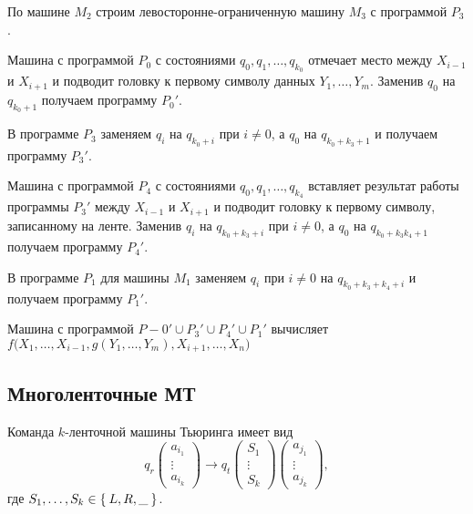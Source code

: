 \begin{eproof}
	\item По машине $ M_2 $ строим левосторонне-ограниченную машину $ M_3 $ с программой $ P_3 $.

	\item Машина с программой $ P_0 $ с состояниями $ q_0, q_1, \dots, q_{k_0} $ отмечает место между $ X_{i - 1} $ и $ X_{i + 1} $ и подводит головку к первому символу данных $ Y_1, \dots, Y_m $.
		Заменив $ q_0 $ на $ q_{k_0 + 1} $ получаем программу $ P_0' $.

	\item В программе $ P_3 $ заменяем $ q_i $ на $ q_{k_0 + i} $ при $ i \ne 0 $, а $ q_0 $ на $ q_{k_0 + k_3 + 1} $ и получаем программу $ P_3' $.

	\item Машина с программой $ P_4 $ с состояниями $ q_0, q_1, \dots, q_{k_4} $ вставляет результат работы программы $ P_3' $ между $ X_{i - 1} $ и $ X_{i + 1} $ и подводит головку к первому символу, записанному на ленте.
		Заменив $ q_i $ на $ q_{k_0 + k_3 + i} $ при $ i \ne 0 $, а $ q_0 $ на $ q_{k_0 + k_3k_4 + 1} $ получаем программу $ P_4' $.

	\item В программе $ P_1 $ для машины $ M_1 $ заменяем $ q_i $ при $ i \ne 0 $ на $ q_{k_0 + k_3 + k_4 + i} $ и получаем программу $ P_1' $.
	
		Машина с программой $ P-0' \cup P_3' \cup P_4' \cup P_1' $ вычисляет $ f \bigl( X_1, \dots, X_{i - 1}, g(Y_1, \dots, Y_m), X_{i + 1}, \dots, X_n \bigr) $
\end{eproof}

\subsection{Многоленточные МТ}

\begin{definition}
	Команда $ k $-ленточной машины Тьюринга имеет вид
	$$ q_r
	\begin{pmatrix}
		a_{i_1} \\
		\vdots \\
		a_{i_k}
	\end{pmatrix} \to q_t
	\begin{pmatrix}
		S_1 \\
		\vdots \\
		S_k
	\end{pmatrix}
	\begin{pmatrix}
		a_{j_1} \\
		\vdots \\
		a_{j_k}
	\end{pmatrix}, $$
	где $ S_1, \dots, S_k \in \Set{L, R, \text\textunderscore} $.
\end{definition}

